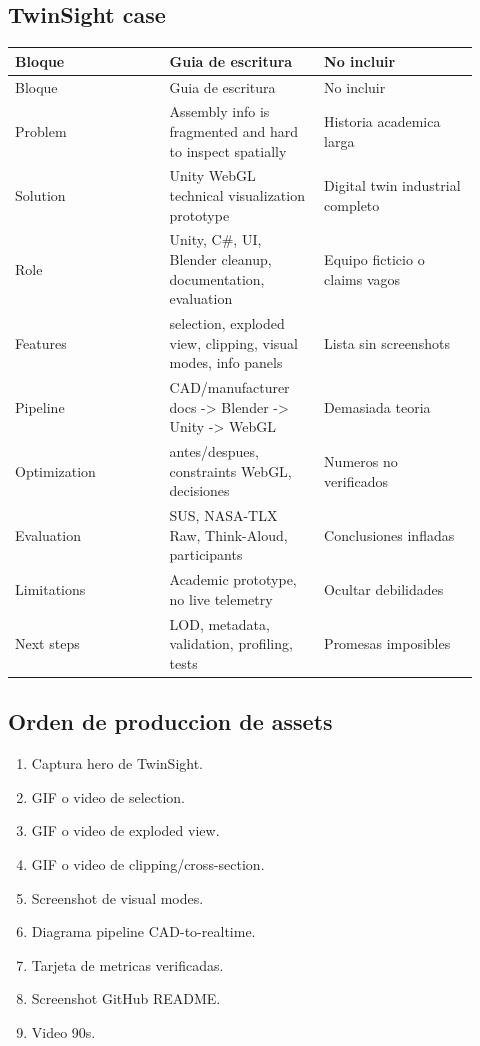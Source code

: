 \subsection{TwinSight case}


\begin{center}
\scriptsize
\begin{longtable}{>{\raggedright\arraybackslash}p{0.305\linewidth} >{\raggedright\arraybackslash}p{0.305\linewidth} >{\raggedright\arraybackslash}p{0.305\linewidth}}
\toprule
Bloque & Guia de escritura & No incluir \\
\midrule
\endfirsthead
\toprule
Bloque & Guia de escritura & No incluir \\
\midrule
\endhead
Problem & Assembly info is fragmented and hard to inspect spatially & Historia academica larga \\
Solution & Unity WebGL technical visualization prototype & Digital twin industrial completo \\
Role & Unity, C\#, UI, Blender cleanup, documentation, evaluation & Equipo ficticio o claims vagos \\
Features & selection, exploded view, clipping, visual modes, info panels & Lista sin screenshots \\
Pipeline & CAD/manufacturer docs -> Blender -> Unity -> WebGL & Demasiada teoria \\
Optimization & antes/despues, constraints WebGL, decisiones & Numeros no verificados \\
Evaluation & SUS, NASA-TLX Raw, Think-Aloud, participants & Conclusiones infladas \\
Limitations & Academic prototype, no live telemetry & Ocultar debilidades \\
Next steps & LOD, metadata, validation, profiling, tests & Promesas imposibles \\
\bottomrule
\end{longtable}
\end{center}



\subsection{Orden de produccion de assets}


\begin{enumerate}
\item Captura hero de TwinSight.
\item GIF o video de selection.
\item GIF o video de exploded view.
\item GIF o video de clipping/cross-section.
\item Screenshot de visual modes.
\item Diagrama pipeline CAD-to-realtime.
\item Tarjeta de metricas verificadas.
\item Screenshot GitHub README.
\item Video 90s.
\end{enumerate}


